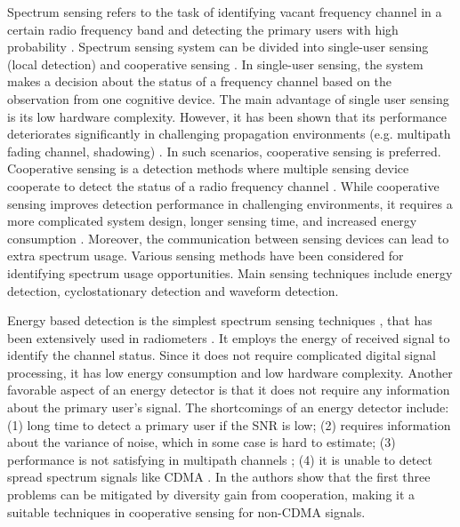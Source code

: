 Spectrum sensing refers to the task of identifying vacant frequency channel in a certain radio frequency band and detecting the primary users with high probability \cite{umar2012spectrum}. 
Spectrum sensing system can be divided into single-user sensing (local detection) and cooperative sensing \cite{wang2011advances, akyildiz2011cooperative, ma2008soft, axell2010overview}. In single-user sensing, the system makes a decision about the status of a frequency channel based on the observation from one cognitive device. The main advantage of single user sensing is its low hardware complexity. However, it has been shown that its performance deteriorates significantly in challenging propagation environments (e.g. multipath fading channel, shadowing) \cite{akyildiz2011cooperative}. In such scenarios, cooperative sensing is preferred. Cooperative sensing is a detection methods where multiple sensing device cooperate to detect the status of a radio frequency channel \cite{ganesan2005cooperative, arslan2007cognitive}. While cooperative sensing improves detection performance in challenging environments, it requires a more complicated system design,  longer sensing time,  and increased energy consumption \cite{akyildiz2011cooperative}.  
Moreover, the communication between sensing devices can lead to extra spectrum usage. 
Various sensing methods have been considered for identifying spectrum usage opportunities. Main sensing techniques include  energy detection, cyclostationary detection and waveform detection. 

Energy based detection is the simplest spectrum sensing techniques , that has been extensively used in radiometers \cite{cabric2004implementation, poor1994introduction, urkowitz1967energy}. It employs the energy of received signal to identify the channel status. Since it does not require complicated digital signal processing, it has low energy consumption and low hardware complexity.  Another favorable aspect of an energy detector is that it does not require  any information about the primary user's signal.  
The shortcomings of an energy detector include: (1)  long time to detect a  primary user if the SNR is low; (2) requires information about the variance of noise, which in some case is hard to estimate; (3) performance is not satisfying in multipath channels \cite{akyildiz2011cooperative}; (4) it is unable to detect spread spectrum signals like CDMA \cite{urkowitz1967energy, akyildiz2011cooperative}. 
In \cite{akyildiz2011cooperative} the authors show that the first three problems can be mitigated by diversity gain from cooperation,  making it a suitable techniques in cooperative sensing for non-CDMA signals.  

